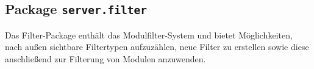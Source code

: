 \FloatBarrier
\subsection[Package server.filter]{Package \texttt{server.filter}}

Das Filter-Package enthält das Modulfilter-System und bietet Möglichkeiten,
nach außen sichtbare Filtertypen aufzuzählen, neue Filter zu erstellen
sowie diese anschließend zur Filterung von Modulen anzuwenden.